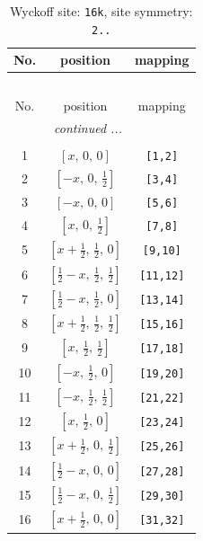 \documentclass[fleqn,8pt]{jsarticle}
\begin{document}
\renewcommand{\arraystretch}{1.2}
\begin{longtable}{ccc}
\caption{Wyckoff site: {\tt 16k}, site symmetry: {\tt 2..}}
 \\
 \hline \hline
No. & position & mapping \\ \hline \endfirsthead

\multicolumn{2}{l}{\tablename\ \thetable{}} \\
 \hline \hline
No. & position & mapping \\ \hline \endhead

 \hline \hline
\multicolumn{2}{r}{\footnotesize\it continued ...} \\ \endfoot

 \hline \hline
\multicolumn{2}{r}{} \\ \endlastfoot

1 & $\left[ x,\, 0,\, 0 \right]$ & {\tt [1,2]} \\ \hline
2 & $\left[ - x,\, 0,\, \frac{1}{2} \right]$ & {\tt [3,4]} \\ \hline
3 & $\left[ - x,\, 0,\, 0 \right]$ & {\tt [5,6]} \\ \hline
4 & $\left[ x,\, 0,\, \frac{1}{2} \right]$ & {\tt [7,8]} \\ \hline
5 & $\left[ x + \frac{1}{2},\, \frac{1}{2},\, 0 \right]$ & {\tt [9,10]} \\ \hline
6 & $\left[ \frac{1}{2} - x,\, \frac{1}{2},\, \frac{1}{2} \right]$ & {\tt [11,12]} \\ \hline
7 & $\left[ \frac{1}{2} - x,\, \frac{1}{2},\, 0 \right]$ & {\tt [13,14]} \\ \hline
8 & $\left[ x + \frac{1}{2},\, \frac{1}{2},\, \frac{1}{2} \right]$ & {\tt [15,16]} \\ \hline
9 & $\left[ x,\, \frac{1}{2},\, \frac{1}{2} \right]$ & {\tt [17,18]} \\ \hline
10 & $\left[ - x,\, \frac{1}{2},\, 0 \right]$ & {\tt [19,20]} \\ \hline
11 & $\left[ - x,\, \frac{1}{2},\, \frac{1}{2} \right]$ & {\tt [21,22]} \\ \hline
12 & $\left[ x,\, \frac{1}{2},\, 0 \right]$ & {\tt [23,24]} \\ \hline
13 & $\left[ x + \frac{1}{2},\, 0,\, \frac{1}{2} \right]$ & {\tt [25,26]} \\ \hline
14 & $\left[ \frac{1}{2} - x,\, 0,\, 0 \right]$ & {\tt [27,28]} \\ \hline
15 & $\left[ \frac{1}{2} - x,\, 0,\, \frac{1}{2} \right]$ & {\tt [29,30]} \\ \hline
16 & $\left[ x + \frac{1}{2},\, 0,\, 0 \right]$ & {\tt [31,32]} \\
\end{longtable}
\end{document}
